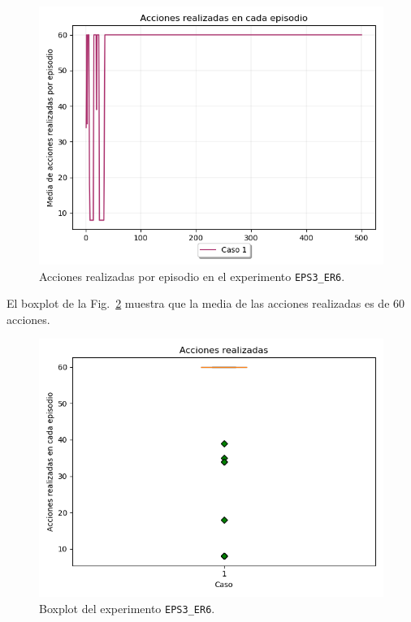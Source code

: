 \begin{figure}
    \centering
    \includegraphics[scale=0.4]{cap5_experimentacion/images/dim5_lr0.01_ep0.5_acciones.png}
    \caption{Acciones realizadas por episodio en el experimento \texttt{EPS3\_ER6}.}
    \label{fig:dim5_lr0.01_ep0.5_acciones}
\end{figure}

El boxplot de la Fig.~\ref{fig:dim5_lr0.01_ep0.5_boxplot} muestra que la media de las acciones realizadas es de 60 acciones. \\
\begin{figure}
    \centering
    \includegraphics[scale=0.4]{cap5_experimentacion/images/dim5_lr0.01_ep0.5_boxplot.png}
    \caption{Boxplot del experimento \texttt{EPS3\_ER6}.}
    \label{fig:dim5_lr0.01_ep0.5_boxplot}
\end{figure}

